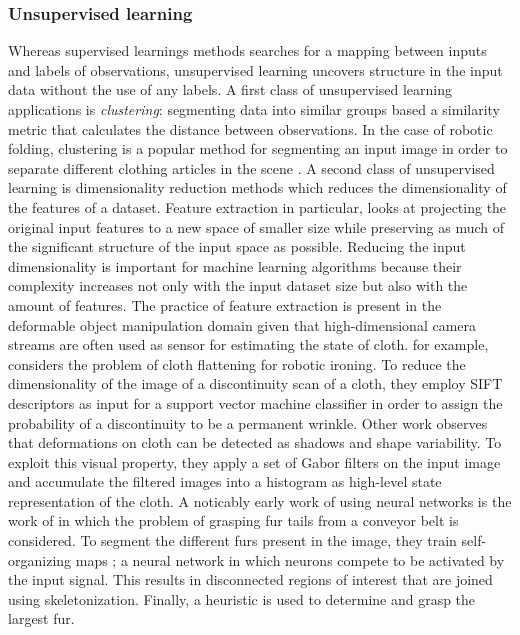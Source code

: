 \documentclass[\home/main.tex]{subfiles}
\begin{document}
\subsubsection{Unsupervised learning}
Whereas supervised learnings methods searches for a mapping between inputs and labels of observations, unsupervised learning uncovers structure in the input data without the use of any labels.
A first class of unsupervised learning applications is \emph{clustering}: segmenting data into similar groups based a similarity metric that calculates the distance between observations. In the case of robotic folding, clustering is a popular method for segmenting an input image in order to separate different clothing articles in the scene \autocite{Doumanoglou2016,Maitin2010,Jia2018}. A second class of unsupervised learning is dimensionality reduction methods which reduces the dimensionality of the features of a dataset. Feature extraction in particular, looks at projecting the original input features to a new space of smaller size while preserving as much of the significant structure of the input space as possible. Reducing the input dimensionality is important for machine learning algorithms because their complexity increases not only with the input dataset size but also with the amount of features. 
The practice of feature extraction is present in the deformable object manipulation domain given that high-dimensional camera streams are often used as sensor for estimating the state of cloth. \textcite{li2016multi} for example, considers the problem of cloth flattening for robotic ironing. To reduce the dimensionality of the image of a discontinuity scan of a cloth, they employ SIFT descriptors \autocite{lowe1999object} as input for a support vector machine classifier in order to assign the probability of a discontinuity to be a permanent wrinkle. Other work \autocite{Jia2018} observes that deformations on cloth can be detected as shadows and shape variability. To exploit this visual property, they apply a set of Gabor filters on the input image and accumulate the filtered images into a histogram as high-level state representation of the cloth.
A noticably early work of using neural networks is the work of \textcite{Foresti2004} in which the problem of grasping fur tails from a conveyor belt is considered. To segment the different furs present in the image, they train self-organizing maps \autocite{Kohonen1982}; a neural network in which neurons compete to be activated by the input signal. This results in disconnected regions of interest that are joined using skeletonization. Finally, a heuristic is used to determine and grasp the largest fur.
\end{document}
